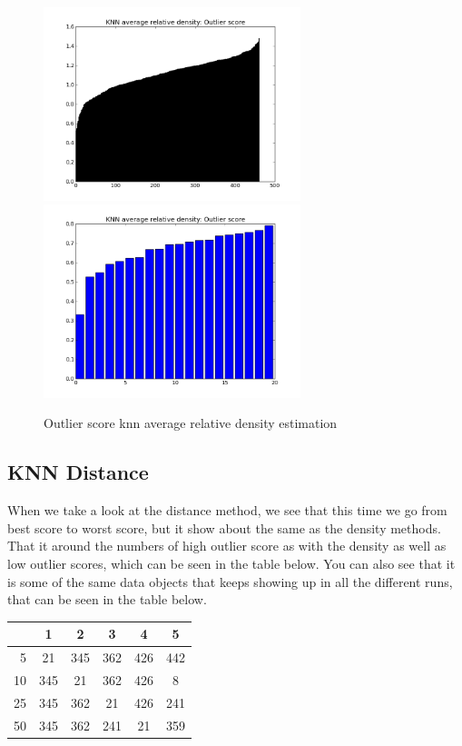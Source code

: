 \begin{figure}[H]
\centering
\includegraphics[width=7.5cm, keepaspectratio=true]{pictures/knnAvgdensityEstimationAll.png}
\includegraphics[width=7.5cm, keepaspectratio=true]{pictures/knnAvgdensityEstimation20.png}
\vspace{-0.4cm}
\caption{\footnotesize Outlier score knn average relative density estimation}
\label{avg}
\end{figure}

\subsection{KNN Distance}

When we take a look at the distance method, we see that this time we go from best score to worst score, but it show about the same as the density methods. That it around the numbers of high outlier score as with the density as well as low outlier scores, which can be seen in the table below. You can also see that it is some of the same data objects that keeps showing up in all the different runs, that can be seen in the table below.

\begin{center}
\begin{tabular}{|r|c|c|c|c|c|}
\hline
   & 1   & 2   & 3   & 4   & 5   \\ \hline
5  & 21  & 345 & 362 & 426 & 442 \\ \hline
10 & 345 & 21  & 362 & 426 & 8   \\ \hline
25 & 345 & 362 & 21  & 426 & 241 \\ \hline
50 & 345 & 362 & 241 & 21  & 359 \\ \hline
\end{tabular}
\end{center}


